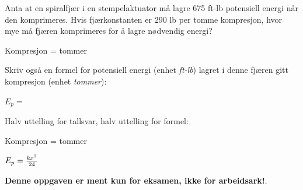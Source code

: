 

Anta at en spiralfjær i en stempelaktuator må lagre 675 ft-lb potensiell energi når den komprimeres. Hvis fjærkonstanten er 290 lb per tomme kompresjon, hvor mye må fjæren komprimeres for å lagre nødvendig energi?

\vskip 10pt

Kompresjon = \underbar{\hskip 50pt} tommer

\vskip 10pt

Skriv også en formel for potensiell energi (enhet {\it ft-lb}) lagret i denne fjæren gitt kompresjon (enhet {\it tommer}):

\vskip 10pt

$E_p = $







Halv uttelling for tallsvar, halv uttelling for formel:

\vskip 10pt

Kompresjon =  tommer

\vskip 10pt

$E_p = {kx^2 \over 24}$







{\bf Denne oppgaven er ment kun for eksamen, ikke for arbeidsark!}.

